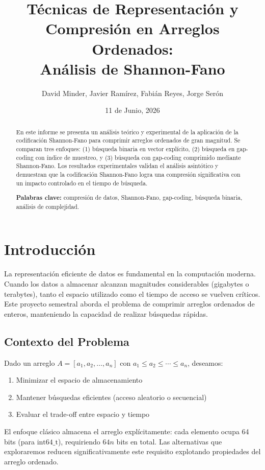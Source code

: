 \documentclass[11pt, twocolumn]{article}
\title{\Large \textbf{Técnicas de Representación y Compresión en Arreglos Ordenados:\\Análisis de Shannon-Fano}}
\author{David Minder, Javier Ramírez, Fabián Reyes, Jorge Serón}
\date{11 de Junio, 2026}
\begin{document}
\maketitle

\begin{abstract}
En este informe se presenta un análisis teórico y experimental de la aplicación de la codificación Shannon-Fano para comprimir arreglos ordenados de gran magnitud. Se comparan tres enfoques: (1) búsqueda binaria en vector explícito, (2) búsqueda en gap-coding con índice de muestreo, y (3) búsqueda con gap-coding comprimido mediante Shannon-Fano. Los resultados experimentales validan el análisis asintótico y demuestran que la codificación Shannon-Fano logra una compresión significativa con un impacto controlado en el tiempo de búsqueda.

\textbf{Palabras clave:} compresión de datos, Shannon-Fano, gap-coding, búsqueda binaria, análisis de complejidad.
\end{abstract}

\section{Introducción}

La representación eficiente de datos es fundamental en la computación moderna. Cuando los datos a almacenar alcanzan magnitudes considerables (gigabytes o terabytes), tanto el espacio utilizado como el tiempo de acceso se vuelven críticos. Este proyecto semestral aborda el problema de comprimir arreglos ordenados de enteros, manteniendo la capacidad de realizar búsquedas rápidas.

\subsection{Contexto del Problema}

Dado un arreglo $A = [a_1, a_2, \ldots, a_n]$ con $a_1 \le a_2 \le \cdots \le a_n$, deseamos:
\begin{enumerate}
    \item Minimizar el espacio de almacenamiento
    \item Mantener búsquedas eficientes (acceso aleatorio o secuencial)
    \item Evaluar el trade-off entre espacio y tiempo
\end{enumerate}

El enfoque clásico almacena el arreglo explícitamente: cada elemento ocupa 64 bits (para $\text{int64\_t}$), requiriendo $64n$ bits en total. Las alternativas que exploraremos reducen significativamente este requisito explotando propiedades del arreglo ordenado.
\end{document}
